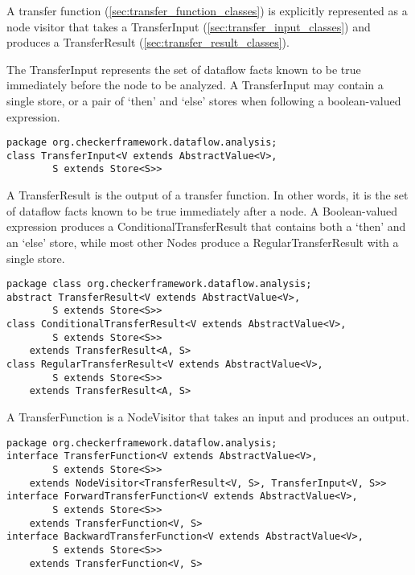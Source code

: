 A transfer function (\autoref{sec:transfer_function_classes}) is
explicitly represented as a node visitor that takes a TransferInput
(\autoref{sec:transfer_input_classes}) and produces a TransferResult
(\autoref{sec:transfer_result_classes}).

\label{sec:transfer_input_classes}

The TransferInput represents the set of dataflow facts known to be
true immediately before the node to be analyzed.  A TransferInput may
contain a single store, or a pair of `then' and `else' stores when
following a boolean-valued expression.

\begin{verbatim}
package org.checkerframework.dataflow.analysis;
class TransferInput<V extends AbstractValue<V>,
        S extends Store<S>>
\end{verbatim}

\label{sec:transfer_result_classes}

A TransferResult is the output of a transfer function.  In other
words, it is the set of dataflow facts known to be true immediately
after a node.  A Boolean-valued expression produces a
ConditionalTransferResult that contains both a `then' and an `else'
store, while most other Nodes produce a RegularTransferResult with a
single store.

\begin{verbatim}
package class org.checkerframework.dataflow.analysis;
abstract TransferResult<V extends AbstractValue<V>,
        S extends Store<S>>
class ConditionalTransferResult<V extends AbstractValue<V>,
        S extends Store<S>>
    extends TransferResult<A, S>
class RegularTransferResult<V extends AbstractValue<V>,
        S extends Store<S>>
    extends TransferResult<A, S>
\end{verbatim}

\label{sec:transfer_function_classes}

A TransferFunction is a NodeVisitor that takes an input and produces an output.

\begin{verbatim}
package org.checkerframework.dataflow.analysis;
interface TransferFunction<V extends AbstractValue<V>,
        S extends Store<S>>
    extends NodeVisitor<TransferResult<V, S>, TransferInput<V, S>>
interface ForwardTransferFunction<V extends AbstractValue<V>,
        S extends Store<S>>
    extends TransferFunction<V, S>
interface BackwardTransferFunction<V extends AbstractValue<V>,
        S extends Store<S>>
    extends TransferFunction<V, S>
\end{verbatim}

